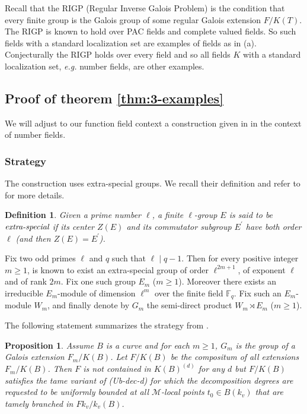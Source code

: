 \documentclass[12pt,english]{amsart}
\newtheorem{twisting lemma}[theorem]{Twisting lemma}
\newtheorem{proposition}[theorem]{Proposition}
\newtheorem{definition}[theorem]{Definition}
\begin{document}
Recall that the RIGP (Regular Inverse Galois Problem) is the condition that every finite group is the Galois group of some regular Galois extension $F/K(T)$.
The RIGP is known to hold over PAC fields and complete valued fields. So such fields with a standard localization set are examples of fields as in (a). Conjecturally the RIGP holds over every field and so all fields $K$ with  a standard localization set, {\it e.g.} number fields, are other examples.

\subsection{Proof of theorem \ref{thm:3-examples}} 
We will adjust to our function field context a construction given in \cite[\S 3]{ChZa} in the context of number fields.

\subsubsection{Strategy} \label{ssec:construction}
The construction uses extra-special groups. We recall their definition and refer to \cite[\S A.20]{Doerk} for more details.

\begin{definition} Given a prime number $\ell$, a finite $\ell$-group  $E$ is said to be $\emph{extra-special}$ if its center $Z(E)$ and its commutator subgroup $E^\prime$ have both order $\ell$ (and then $Z(E)=E^\prime$).
\end{definition}

Fix two odd primes $\ell$ and $q$ such that $\ell\mid q-1$.  Then for every positive integer $m\geq 1$, is known to exist an extra-special group  of order $\ell^{2m+1}$, of exponent $\ell$ and of rank $2m$. Fix one such group $E_m$ ($m\geq 1$). Moreover there exists an irreducible $E_m$-module of dimension $\ell^m$ over the finite field $\mathbb{F}_q$. Fix such an $E_m$-module $W_m$, and finally denote by $G_m$ the semi-direct product $W_m\rtimes E_m$ ($m\geq 1$).

The following statement summarizes the strategy from \cite[\S 3]{ChZa}.

\begin{proposition} \label{c_ex_p} Assume $B$ is a curve
and for each $m\geq 1$, $G_m$ is the group of a Galois extension $F_m/K(B)$. Let $F/K(B)$ be the compositum  of all extensions $F_m/K(B)$. Then $F$ is not contained in $K(B)^{(d)}$ for any $d$ but $F/K(B)$ satisfies the {\rm tame} variant of {\rm (Ub-dec-d)} for which the decomposition degrees are requested to be uniformly bounded at all ${\mathcal M}$-local points $t_0\in B(k_v)$ that are {\rm tamely} 
branched in  $Fk_v/k_v(B)$.
\end{proposition}
\end{document}
